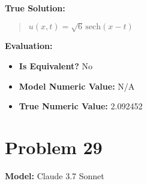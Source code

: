 \documentclass{article}
\begin{document}
\textbf{True Solution:}
\begin{quote}
$u(x,t)= \sqrt{6} \, \mathrm{sech}(x-t)$
\end{quote}

\textbf{Evaluation:}
\begin{itemize}
\item \textbf{Is Equivalent?} No
\item \textbf{Model Numeric Value:} N/A
\item \textbf{True Numeric Value:} 2.092452
\end{itemize}
\vspace{1cm}
\section*{Problem 29}
\textbf{Model:} Claude 3.7 Sonnet
\end{document}
